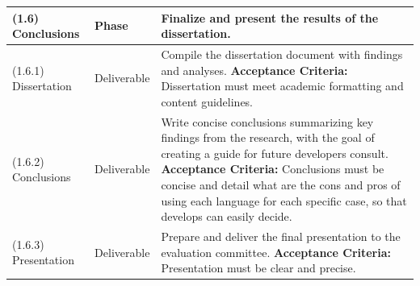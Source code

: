 \begin{longtable}{|p{3cm}|p{2.5cm}|p{8cm}|}
    (1.6) Conclusions              & Phase                 & Finalize and present the results of the dissertation.                                                                                                                                                                                                                                                                                                     \\ \hline
    (1.6.1) Dissertation           & Deliverable           & Compile the dissertation document with findings and analyses. \newline \textbf{Acceptance Criteria:} Dissertation must meet academic formatting and content guidelines.                                                                                                                                                                                   \\ \hline
    (1.6.2) Conclusions            & Deliverable           & Write concise conclusions summarizing key findings from the research, with the goal of creating a guide for future developers consult. \newline \textbf{Acceptance Criteria:} Conclusions must be concise and detail what are the cons and pros of using each language for each specific case, so that develops can easily decide.                        \\ \hline
    (1.6.3) Presentation           & Deliverable           & Prepare and deliver the final presentation to the evaluation committee. \newline \textbf{Acceptance Criteria:} Presentation must be clear and precise.                                                                                                                                                                                                    \\ \hline
\end{longtable}
